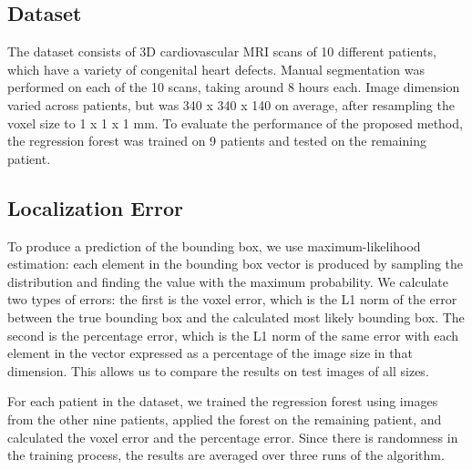 \subsection{Dataset}
The dataset consists of 3D cardiovascular MRI scans of 10 different patients, which have a variety of congenital heart defects. Manual segmentation was performed on each of the 10 scans, taking around 8 hours each. Image dimension varied across patients, but was 340 x 340 x 140 on average, after resampling the voxel size to 1 x 1 x 1 mm. To evaluate the performance of the proposed method, the regression forest was trained on 9 patients and tested on the remaining patient. 

\subsection{Localization Error}
To produce a prediction of the bounding box, we use maximum-likelihood estimation: each element in the bounding box vector is produced by sampling the distribution and finding the value with the maximum probability. We calculate two types of errors: the first is the voxel error, which is the L1 norm of the error between the true bounding box and the calculated most likely bounding box. The second is the percentage error, which is the L1 norm of the same error with each element in the vector expressed as a percentage of the image size in that dimension. This allows us to compare the results on test images of all sizes.

For each patient in the dataset, we trained the regression forest using images from the other nine patients, applied the forest on the remaining patient, and calculated the voxel error and the percentage error. Since there is randomness in the training process, the results are averaged over three runs of the algorithm.

